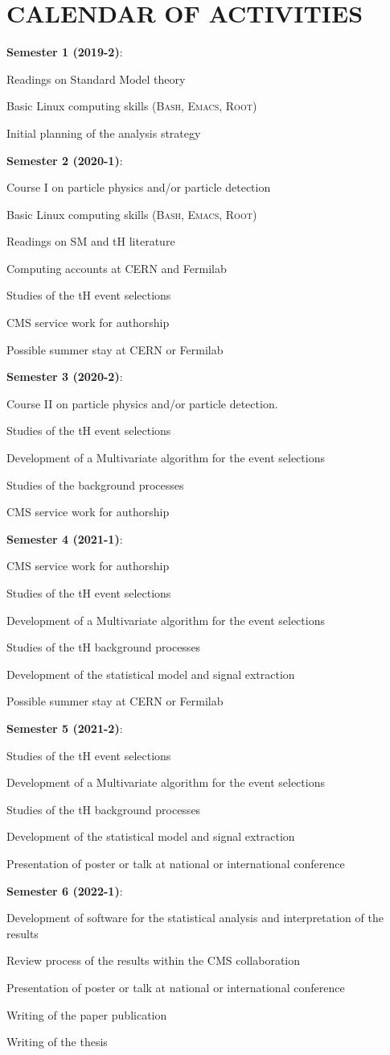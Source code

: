 \documentclass[final,3p]{CSP}
\newcommand{\SubItem}[1]{
    {\setlength\itemindent{15pt} \item[-] #1}
}
\begin{document}
\section{CALENDAR OF ACTIVITIES}
\onehalfspacing
\begin{itemize}
\item {\bf Semester 1 (2019-2)}:
  \SubItem{ Readings on Standard Model theory}
  \SubItem{ Basic Linux computing skills (\textsc{Bash, Emacs, Root})}
  \SubItem{ Initial planning of the analysis strategy}
\item {\bf Semester 2 (2020-1)}:
  \SubItem{ Course I on particle physics and/or particle detection}
  \SubItem{ Basic Linux computing skills (\textsc{Bash, Emacs, Root})}
  \SubItem{ Readings on SM and tH literature}
  \SubItem{ Computing accounts at CERN and Fermilab}
  \SubItem{ Studies of the tH event selections}
  \SubItem{ CMS service work for authorship}
  \SubItem{ Possible summer stay at CERN or Fermilab}
\item {\bf Semester 3 (2020-2)}:
  \SubItem{ Course II on particle physics and/or particle detection.}
  \SubItem{ Studies of the tH event selections}
  \SubItem{ Development of a Multivariate algorithm for the event selections}
  \SubItem{ Studies of the background processes}
  \SubItem{ CMS service work for authorship}
\item {\bf Semester 4 (2021-1)}:
  \SubItem{ CMS service work for authorship}
  \SubItem{ Studies of the tH event selections}
  \SubItem{ Development of a Multivariate algorithm for the event selections}
  \SubItem{ Studies of the tH background processes}
  \SubItem{ Development of the statistical model and signal extraction}
  \SubItem{ Possible summer stay at CERN or Fermilab}
\item {\bf Semester 5 (2021-2)}:
  \SubItem{ Studies of the tH event selections}
  \SubItem{ Development of a Multivariate algorithm for the event selections}
  \SubItem{ Studies of the tH background processes}
  \SubItem{ Development of the statistical model and signal extraction}
  \SubItem{ Presentation of poster or talk at national or international conference}
\item {\bf Semester 6 (2022-1)}:
  \SubItem{ Development of software for the statistical analysis and interpretation of the results}
  \SubItem{ Review process of the results within the CMS collaboration}
  \SubItem{ Presentation of poster or talk at national or international conference}
  \SubItem{ Writing of the paper publication}
  \SubItem{ Writing of the thesis}
\end{itemize}





\cleardoublepage
\onehalfspacing


\end{document}
